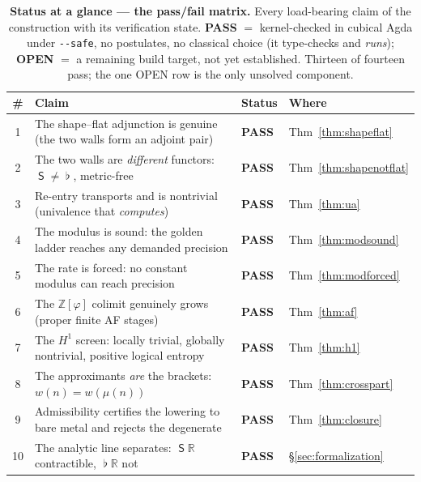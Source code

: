 \documentclass[11pt,letterpaper]{article}
\theoremstyle{plain}
\theoremstyle{definition}
\theoremstyle{remark}
\newcommand{\shapeM}{\mathop{\mathsf{S}}\nolimits}      %
\newcommand{\flatM}{\mathop{\flat}\nolimits}            %
\newcommand{\ZZ}{\mathbb{Z}}
\newcommand{\RR}{\mathbb{R}}
\newcommand{\Zphi}{\ZZ[\varphi]}
\newcommand{\modulus}{\mu}
\begin{document}
\begin{table}[t]
\centering
\small
\setlength{\tabcolsep}{5pt}
\renewcommand{\arraystretch}{1.16}
\caption{\textbf{Status at a glance --- the pass/fail matrix.} Every load-bearing
claim of the construction with its verification state.
\textcolor{okGreen}{\textbf{PASS}} $=$ kernel-checked in cubical Agda under
\texttt{-{}-safe}, no postulates, no classical choice (it type-checks and
\emph{runs}); \textcolor{okVerm}{\textbf{OPEN}} $=$ a remaining build target, not
yet established. Thirteen of fourteen pass; the one \textcolor{okVerm}{OPEN} row is
the only unsolved component.}
\label{tab:passfail}
\begin{tabular}{@{}c>{\raggedright\arraybackslash}p{8.3cm}l>{\raggedright\arraybackslash}p{2.5cm}@{}}
\toprule
\# & Claim & Status & Where \\
\midrule
1 & The shape--flat adjunction is genuine (the two walls form an adjoint pair) & \textcolor{okGreen}{\textbf{PASS}} & Thm~\ref{thm:shapeflat} \\
2 & The two walls are \emph{different} functors: $\shapeM \neq \flatM$, metric-free & \textcolor{okGreen}{\textbf{PASS}} & Thm~\ref{thm:shapenotflat} \\
3 & Re-entry transports and is nontrivial (univalence that \emph{computes}) & \textcolor{okGreen}{\textbf{PASS}} & Thm~\ref{thm:ua} \\
4 & The modulus is sound: the golden ladder reaches any demanded precision & \textcolor{okGreen}{\textbf{PASS}} & Thm~\ref{thm:modsound} \\
5 & The rate is forced: no constant modulus can reach precision & \textcolor{okGreen}{\textbf{PASS}} & Thm~\ref{thm:modforced} \\
6 & The $\Zphi$ colimit genuinely grows (proper finite AF stages) & \textcolor{okGreen}{\textbf{PASS}} & Thm~\ref{thm:af} \\
7 & The $H^1$ screen: locally trivial, globally nontrivial, positive logical entropy & \textcolor{okGreen}{\textbf{PASS}} & Thm~\ref{thm:h1} \\
8 & The approximants \emph{are} the brackets: $w(n)=w(\modulus(n))$ & \textcolor{okGreen}{\textbf{PASS}} & Thm~\ref{thm:crosspart} \\
9 & Admissibility certifies the lowering to bare metal and rejects the degenerate & \textcolor{okGreen}{\textbf{PASS}} & Thm~\ref{thm:closure} \\
10 & The analytic line separates: $\shapeM\RR$ contractible, $\flatM\RR$ not & \textcolor{okGreen}{\textbf{PASS}} & \S\ref{sec:formalization} \\

\end{tabular}
\end{table}
\end{document}
